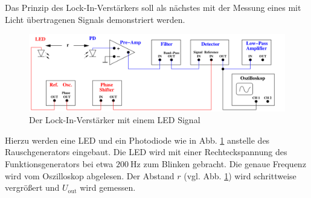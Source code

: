 Das Prinzip des Lock-In-Verstärkers soll als nächstes mit der Messung eines mit Licht übertragenen Signals demonstriert werden.
\begin{figure}
    \includegraphics[width=\textwidth]{Abbildungen/Lock-In-mit-LED-Signal.png}
    \caption{Der Lock-In-Verstärker mit einem LED Signal \cite[][]{man:v303}}
    \label{fig:Lock-In-LED}
\end{figure}
%
Hierzu werden eine LED und ein Photodiode wie in Abb. \ref{fig:Lock-In-LED} anstelle des Rauschgenerators eingebaut.
Die LED wird mit einer Rechteckspannung des Funktionsgenerators bei etwa $\qty{200}{\hertz}$ zum Blinken gebracht.
Die genaue Frequenz wird vom Oszilloskop abgelesen. 
Der Abstand $r$ (vgl. Abb. \ref{fig:Lock-In-LED}) wird schrittweise vergrößert und $U_\text{out}$ wird gemessen.
